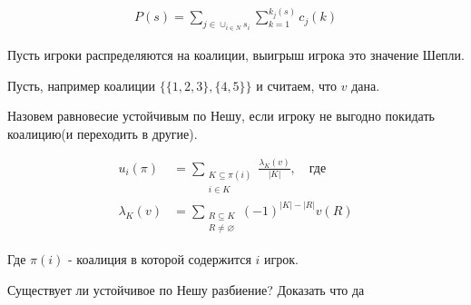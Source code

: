 \begin{align*}
	P(s) = \sum_{j \in \cup_{i \in N} s_i} \sum_{k = 1}^{k_j(s)} c_j(k)
\end{align*}

\begin{problem}
	Пусть игроки распределяются на коалиции, выигрыш игрока это значение Шепли.

	Пусть, например коалиции $\{\{1, 2, 3\}, \{4, 5\}\}$ и считаем, что $v$ дана.

	Назовем равновесие устойчивым по Нешу, если игроку не выгодно покидать коалицию(и переходить в другие).

	\begin{align*}
		u_i(\pi) &= \sum_{\substack{K \subseteq \pi(i) \\ i \in K}} \frac{\lambda_K(v)}{|K|}, \quad \text{где} \\
		\lambda_K(v) &= \sum_{\substack{R \subseteq K \\ R \neq \varnothing}} (-1)^{|K| - |R|} v(R)
	\end{align*}

	Где $\pi(i)$ - коалиция в которой содержится  $i$ игрок.

	Существует ли устойчивое по Нешу разбиение? Доказать что да
\end{problem}


